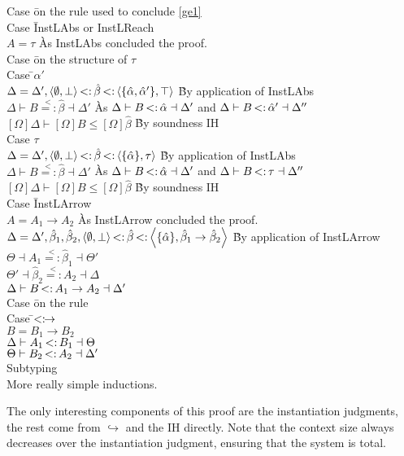 \documentclass{article}
\newcommand{\st}{\ensuremath{\hspace{-1px}<:\hspace{-1px}}}
\newcommand{\alphahat}{\hat{\alpha}}
\newcommand{\betahat}{\hat{\beta}}
\newcommand{\instr}{\overset{<}{=:}}
\newcommand{\pair}[2]{\left<#1,#2\right>}
\begin{document}
\begin{tabbing}
\>\> Case \=on the rule used to conclude \ref{ge1}\\
\>\>\> Case \=InstLAbs or InstLReach\\
\>\>\>\>$A = \tau$ \` As InstLAbs concluded the proof.\\
\>\>\>\>Case \=on the structure of $\tau$\\
\>\>\>\>\> Case \=$\alphahat'$\\
\>\>\>\>\>\>$\Delta=\Delta',\pair{\emptyset}{\bot} \st \betahat \st \pair{\{\alphahat,\alphahat'\}}{\top}$ \` By application of InstLAbs\\
\>\>\>\>\>\>$\Delta \vdash B \instr \betahat \dashv \Delta'$ \` As $\Delta \vdash B \st \alphahat \dashv \Delta'$ and $\Delta \vdash B \st \alphahat' \dashv \Delta''$\\
\>\>\>\>\>\>$[\Omega]\Delta \vdash [\Omega]B \leq [\Omega] \betahat$ \` By soundness IH\\
\>\>\>\>\> Case $\tau$\\
\>\>\>\>\>\> $\Delta=\Delta',\pair{\emptyset}{\bot} \st \betahat \st \pair{\{\alphahat\}}{\tau}$ \` By application of InstLAbs\\
\>\>\>\>\>\>$\Delta \vdash B \instr \betahat \dashv \Delta'$ \` As $\Delta \vdash B \st \alphahat \dashv \Delta'$ and $\Delta \vdash B \st \tau \dashv \Delta''$\\
\>\>\>\>\>\>$[\Omega]\Delta \vdash [\Omega]B \leq [\Omega] \betahat$ \` By soundness IH\\
\>\>\> Case \=InstLArrow\\
\>\>\>\>$A = A_1 \rightarrow A_2$ \` As InstLArrow concluded the proof.\\
\>\>\>\>$\Delta=\Delta',\betahat_1,\betahat_2,\pair{\emptyset}{\bot} \st \betahat \st \pair{\{\alphahat\}}{\betahat_1 \rightarrow \betahat_2}$ \` By application of InstLArrow\\
\>\>\>\>$\Theta \dashv A_1 \instr \betahat_1 \dashv \Theta'$\\
\>\>\>\>$\Theta' \dashv \betahat_2 \instr A_2 \dashv \Delta$\\
\>\>\>\>$\Delta \vdash B \st A_1 \rightarrow A_2 \dashv \Delta'$\\
\>\>\>\>Case \=on the rule\\
\>\>\>\>\>Case \=$\st\rightarrow$\\
\>\>\>\>\>\>$B = B_1 \rightarrow B_2$\\
\>\>\>\>\>\>$\Delta \vdash A_1 \st B_1 \dashv \Theta$\\
\>\>\>\>\>\>$\Theta \vdash B_2 \st A_2 \dashv \Delta'$\\
Subtyping\\
\>More really simple inductions.\\
\end{tabbing}
The only interesting components of this proof are the instantiation judgments, the rest come from $\hookrightarrow$ and the IH directly. Note that the context size always decreases over the instantiation judgment, ensuring that the system is total.
\end{document}
